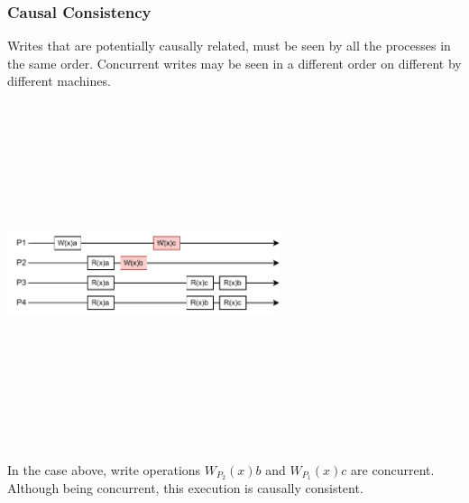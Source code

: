 \documentclass{article}
\begin{document}
\subsubsection{Causal Consistency}
Writes that are potentially causally related, must be seen by all the processes in the same order. Concurrent writes may be seen in a different order on different by different machines.
\begin{center}
	\includegraphics[width=8cm, height=10cm, keepaspectratio]{assets/causal-consistency.pdf}
\end{center}
In the case above, write operations $W_{P_2}(x)b$ and $W_{P_1}(x)c$ are concurrent. Although being concurrent, this execution is causally consistent.
\end{document}

